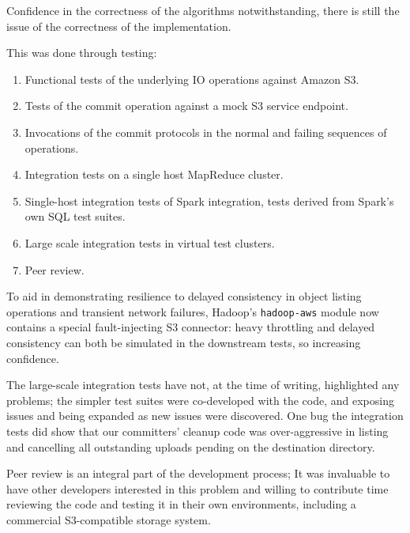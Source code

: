 \documentclass[conference]{IEEEtran}
\begin{document}
Confidence in the correctness of the algorithms notwithstanding, there
is still the issue of the correctness of the implementation.


This was done through testing:

\begin{enumerate}
  \item Functional tests of the underlying IO operations against Amazon S3.
  \item Tests of the commit operation against a mock S3 service endpoint.
  \item Invocations of the commit protocols in the normal and failing sequences of operations.
  \item Integration tests on a single host MapReduce cluster.
  \item Single-host integration tests of Spark integration, tests derived from Spark's own SQL test suites.
  \item Large scale integration tests in virtual test clusters.
  \item Peer review.
\end{enumerate}

To aid in demonstrating resilience to delayed consistency in object listing
operations and transient network failures, Hadoop's \texttt{hadoop-aws} module
now contains a special fault-injecting S3 connector: heavy throttling and
delayed consistency can both be simulated in the downstream tests, so
increasing confidence.

The large-scale integration tests have not, at the time of writing, highlighted any problems;
the simpler test suites were co-developed with the code, and exposing issues and
being expanded as new issues were discovered.
One bug the integration tests did show that our committers' cleanup code was
over-aggressive in listing and cancelling all outstanding uploads pending
on the destination directory.

Peer review is an integral part of the development process;
It was invaluable to have other developers interested in this problem
and willing to contribute time reviewing the code and testing it
in their own environments, including a commercial S3-compatible
storage system.
\end{document}
